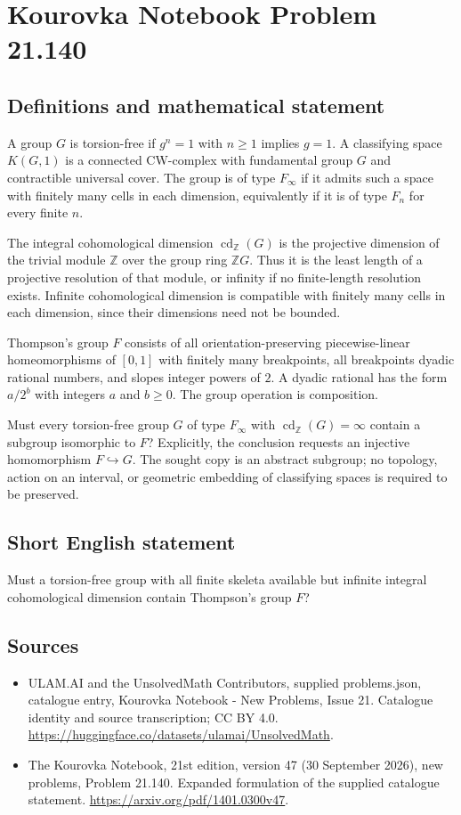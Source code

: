 \documentclass[11pt,a4paper]{article}
\begin{document}
\section*{Kourovka Notebook Problem 21.140}\label{statement}

\subsection{Definitions and mathematical statement}
A group $G$ is torsion-free if $g^n=1$ with $n\ge1$ implies $g=1$. A classifying space $K(G,1)$ is a connected CW-complex with fundamental group $G$ and contractible universal cover. The group is of type $F_\infty$ if it admits such a space with finitely many cells in each dimension, equivalently if it is of type $F_n$ for every finite $n$.

The integral cohomological dimension $\operatorname{cd}_{\mathbb Z}(G)$ is the projective dimension of the trivial module $\mathbb Z$ over the group ring $\mathbb ZG$. Thus it is the least length of a projective resolution of that module, or infinity if no finite-length resolution exists. Infinite cohomological dimension is compatible with finitely many cells in each dimension, since their dimensions need not be bounded.

Thompson's group $F$ consists of all orientation-preserving piecewise-linear homeomorphisms of $[0,1]$ with finitely many breakpoints, all breakpoints dyadic rational numbers, and slopes integer powers of $2$. A dyadic rational has the form $a/2^b$ with integers $a$ and $b\ge0$. The group operation is composition.

Must every torsion-free group $G$ of type $F_\infty$ with $\operatorname{cd}_{\mathbb Z}(G)=\infty$ contain a subgroup isomorphic to $F$? Explicitly, the conclusion requests an injective homomorphism $F\hookrightarrow G$. The sought copy is an abstract subgroup; no topology, action on an interval, or geometric embedding of classifying spaces is required to be preserved.
\subsection{Short English statement}
Must a torsion-free group with all finite skeleta available but infinite integral cohomological dimension contain Thompson’s group $F$?
\subsection{Sources}
\begin{itemize}
\item[S1] ULAM.AI and the UnsolvedMath Contributors, supplied problems.json, catalogue entry, Kourovka Notebook - New Problems, Issue 21. Catalogue identity and source transcription; CC BY 4.0.
\url{https://huggingface.co/datasets/ulamai/UnsolvedMath}.
\item[S2] The Kourovka Notebook, 21st edition, version 47 (30 September 2026), new problems, Problem 21.140. Expanded formulation of the supplied catalogue statement.
\url{https://arxiv.org/pdf/1401.0300v47}.
\end{itemize}
\end{document}
